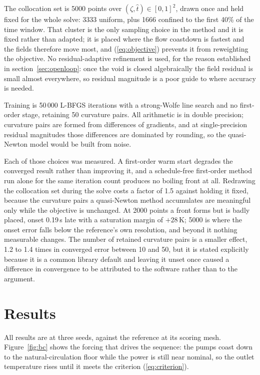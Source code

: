 \documentclass[11pt,a4paper]{article}
\begin{document}
The collocation set is 5000 points over $(\zeta,\hat{t}) \in [0,1]^2$, drawn once and held
fixed for the whole solve: 3333 uniform, plus 1666 confined to the first 40\% of the time
window. That cluster is the only sampling choice in the method and it is fixed rather than
adapted; it is placed where the flow coastdown is fastest and the fields therefore move
most, and (\ref{eq:objective}) prevents it from reweighting the objective. No
residual-adaptive refinement is used, for the reason established in
section~\ref{sec:openloop}: once the void is closed algebraically the field residual is
small almost everywhere, so residual magnitude is a poor guide to where accuracy is needed.

Training is 50\,000 L-BFGS iterations \cite{nocedal} with a strong-Wolfe line search and no
first-order stage, retaining 50 curvature pairs. All arithmetic is in double precision;
curvature pairs are formed from differences of gradients, and at single-precision residual
magnitudes those differences are dominated by rounding, so the quasi-Newton model would be
built from noise.

Each of those choices was measured. A first-order warm start degrades the converged result
rather than improving it, and a schedule-free first-order method run alone for the same
iteration count produces no boiling front at all. Redrawing the collocation set during the
solve costs a factor of 1.5 against holding it fixed, because the curvature pairs a
quasi-Newton method accumulates are meaningful only while the objective is unchanged. At
2000 points a front forms but is badly placed, onset 0.19\,s late with a saturation margin
of $+28$\,K; 5000 is where the onset error falls below the reference's own resolution, and
beyond it nothing measurable changes. The number of retained curvature pairs is a smaller
effect, 1.2 to 1.4 times in converged error between 10 and 50, but it is stated explicitly
because it is a common library default and leaving it unset once caused a difference in
convergence to be attributed to the software rather than to the argument.

\section{Results}\label{sec:results}

All results are at three seeds, against the reference at its scoring mesh.
Figure~\ref{fig:bc} shows the forcing that drives the sequence: the pumps coast down to the
natural-circulation floor while the power is still near nominal, so the outlet temperature
rises until it meets the criterion (\ref{eq:criterion}).
\end{document}
